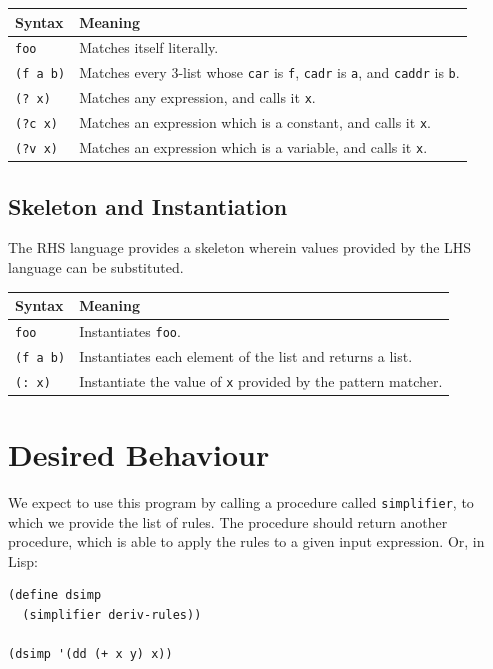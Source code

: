 \documentclass[9pt]{report}
\begin{document}
\begin{center}
\begin{tabular}{ll}
\toprule
Syntax & Meaning\\
\midrule
\texttt{foo} & Matches itself literally.\\
\texttt{(f a b)} & Matches every 3-list whose \texttt{car} is \texttt{f}, \texttt{cadr} is \texttt{a}, and \texttt{caddr} is \texttt{b}.\\
\texttt{(? x)} & Matches any expression, and calls it \texttt{x}.\\
\texttt{(?c x)} & Matches an expression which is a constant, and calls it \texttt{x}.\\
\texttt{(?v x)} & Matches an expression which is a variable, and calls it \texttt{x}.\\
\bottomrule
\end{tabular}
\end{center}


\subsection{Skeleton and Instantiation}
\label{sec:orgdf40135}
The RHS language provides a skeleton wherein values provided by
the LHS language can be substituted.

\begin{center}
\begin{tabular}{ll}
\toprule
Syntax & Meaning\\
\midrule
\texttt{foo} & Instantiates \texttt{foo}.\\
\texttt{(f a b)} & Instantiates each element of the list and returns a list.\\
\texttt{(: x)} & Instantiate the value of \texttt{x} provided by the pattern matcher.\\
\bottomrule
\end{tabular}
\end{center}

\section{Desired Behaviour}
\label{sec:org1b11b44}

We expect to use this program by calling a procedure called
\texttt{simplifier}, to which we provide the list of rules. The procedure
should return another procedure, which is able to apply the rules
to a given input expression. Or, in Lisp:

\begin{verbatim}
(define dsimp
  (simplifier deriv-rules))

(dsimp '(dd (+ x y) x))
\end{verbatim}
\end{document}

